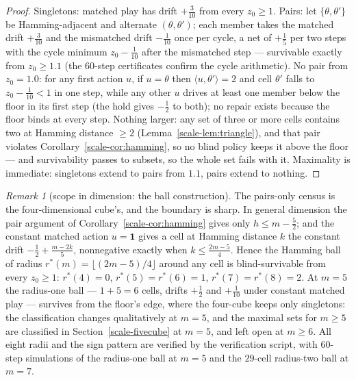 \documentclass[10pt,twocolumn]{article}
\theoremstyle{plain}
\theoremstyle{definition}
\theoremstyle{remark}
\newtheorem{remark}[theorem]{Remark}
\begin{document}
\begin{proof}
Singletons: matched play has drift \(+\tfrac3{10}\) from every
\(z_{0} \ge 1\). Pairs: let \(\{\theta, \theta'\}\) be
Hamming-adjacent and alternate \((\theta, \theta')\); each member
takes the matched drift \(+\tfrac3{10}\) and the mismatched drift
\(-\tfrac1{10}\) once per cycle, a net of \(+\tfrac15\) per two
steps with the cycle minimum \(z_{0} - \tfrac1{10}\) after the
mismatched step --- survivable exactly from \(z_{0} \ge 1.1\)
(the \(60\)-step certificates confirm the cycle arithmetic).
No pair from \(z_{0} = 1.0\): for any first action \(u\), if
\(u = \theta\) then \(\langle u, \theta'\rangle = 2\) and cell
\(\theta'\) falls to \(z_{0} - \tfrac1{10} < 1\) in one step, while
any other \(u\) drives at least one member below the floor in its
first step (the hold gives \(-\tfrac12\) to both); no repair exists
because the floor binds at every step. Nothing larger: any set of
three or more cells contains two at Hamming distance \(\ge 2\)
(Lemma~\ref{scale-lem:triangle}), and that pair violates
Corollary~\ref{scale-cor:hamming}, so no blind policy keeps it above the
floor --- and survivability passes to subsets, so the whole set fails
with it. Maximality is immediate: singletons extend to pairs from
\(1.1\), pairs extend to nothing.
\end{proof}

\begin{remark}[scope in dimension: the ball construction]
\label{scale-rem:scope}
The pairs-only census is the four-dimensional cube's, and the boundary
is sharp. In general dimension the pair argument of
Corollary~\ref{scale-cor:hamming} gives only \(h \le m - \tfrac52\); and
the constant matched action \(u = \mathbf{1}\) gives a cell at
Hamming distance \(k\) the constant drift
\(-\tfrac12 + \tfrac{m - 2k}{5}\), nonnegative exactly when
\(k \le \tfrac{2m-5}{4}\). Hence the Hamming ball of radius
\(r^{*}(m) = \lfloor (2m - 5)/4 \rfloor\) around any cell is
blind-survivable from every \(z_{0} \ge 1\):
\(r^{*}(4) = 0\), \(r^{*}(5) = r^{*}(6) = 1\),
\(r^{*}(7) = r^{*}(8) = 2\). At \(m = 5\) the radius-one ball ---
\(1 + 5 = 6\) cells, drifts \(+\tfrac12\) and \(+\tfrac1{10}\)
under constant matched play --- survives from the floor's edge, where
the four-cube keeps only singletons: the classification changes
qualitatively at \(m = 5\), and the maximal sets for \(m \ge 5\) are classified in Section~\ref{scale-fivecube} at \(m = 5\), and left open at \(m \ge 6\). All eight radii and the sign pattern are
verified by the verification script, with \(60\)-step simulations of the
radius-one ball at \(m = 5\) and the \(29\)-cell radius-two ball at
\(m = 7\).
\end{remark}
\end{document}
